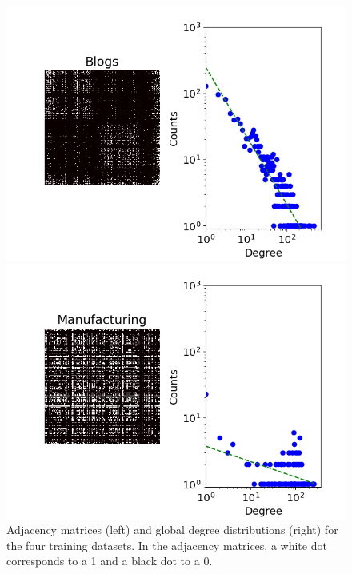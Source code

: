 \documentclass[journal]{IEEEtran}
\begin{document}
\begin{figure}[ht!]
\begin{minipage}{0.4\textwidth}
            \includegraphics[width=\textwidth]{img/corpus/blogs_dd}
        \end{minipage}
        \begin{minipage}{0.4\textwidth}
            \includegraphics[width=\textwidth]{img/corpus/manufacturing_dd}
        \end{minipage}
	\caption{Adjacency matrices (left) and global degree distributions (right) for the four training datasets. In the adjacency matrices, a white dot corresponds to a 1 and a black dot to a 0.}
	\label{fig:corpuses}
\end{figure}
\end{document}
